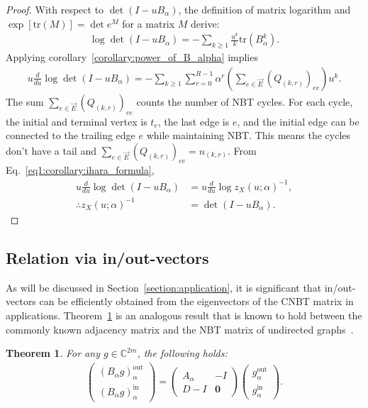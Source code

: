 \documentclass{article}
\theoremstyle{plain}
\newtheorem{theorem}{Theorem}
\begin{document}
\begin{proof}
	With respect to $\det (I - u B_{\alpha})$,
	the definition of matrix logarithm and $\exp\left[ \mathrm{tr}\left( M \right) \right] = \det e^M$ for a matrix $M$ derive:
	\begin{align*}
		\log\det (I - u B_{\alpha})
		= - \sum_{k \geq 1} \frac{u^k}{k} \mathrm{tr}\left( B_{\alpha}^k \right)
		.
	\end{align*}
	Applying corollary~\ref{corollary:power_of_B_alpha} implies
	\begin{align*}
		u \frac{d}{du} \log\det \left( I - u B_{\alpha} \right)
		= - \sum_{k\geq 1} \sum_{r=0}^{R-1} \alpha^r \left( \sum_{e \in \vec{E}} \left( Q_{(k,r)} \right)_{ee} \right) u^k
		.
	\end{align*}
	The sum $\sum_{e \in \vec{E}} \left( Q_{(k,r)} \right)_{ee}$ counts the number of NBT cycles.
	For each cycle, the initial and terminal vertex is $t_e$, the last edge is $e$, and the initial edge can be connected to the trailing edge $e$ while maintaining NBT.
	This means the cycles don't have a tail and $\sum_{e \in \vec{E}} \left( Q_{(k,r)} \right)_{ee} = n_{(k,r)}$.
	From Eq.~\eqref{eq1:corollary:ihara_formula},
	\begin{align*}
		u \frac{d}{du} \log\det \left( I - u B_{\alpha} \right)
		 & = u \frac{d}{du} \log z_{X}(u; \alpha)^{-1}
		,                                              \\
		\therefore
		z_{X}(u; \alpha)^{-1}
		 & = \det \left( I - u B_{\alpha} \right)
		.
	\end{align*}
\end{proof}

\subsection{Relation via in/out-vectors}
As will be discussed in Section~\ref{section:application},
it is significant that in/out-vectors can be efficiently obtained from the eigenvectors of the CNBT matrix in applications.
Theorem~\ref{theorem:edge-wise_to_node-wise} is an analogous result that is known to hold between the commonly known adjacency matrix and the NBT matrix of undirected graphs~\citep{Krzakala2013-up}.

\begin{theorem}\label{theorem:edge-wise_to_node-wise}
	For any $g \in \mathbb{C}^{2m}$, the following holds:
	\begin{align}
		\begin{pmatrix}
			\left( B_{\alpha} g \right)_{\alpha}^{\text{out}}
			\\
			\left( B_{\alpha} g \right)_{\alpha}^{\text{in}}
		\end{pmatrix} =
		\begin{pmatrix}
			A_{\alpha} & -I
			\\
			D-I        & \bm{0}
		\end{pmatrix} \begin{pmatrix} g_{\alpha}^{\text{out}} \\ g_{\alpha}^{\text{in}} \end{pmatrix}
		.\label{eq:theorem:edge-wise_to_node-wise}
	\end{align}
\end{theorem}
\end{document}
